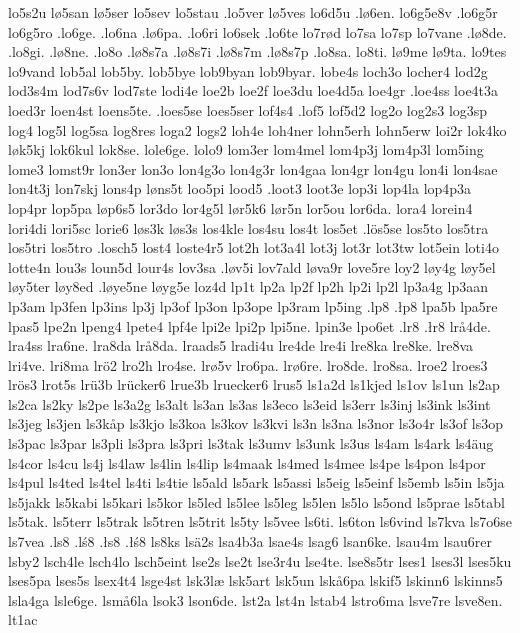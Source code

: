 {{lo5s2u
lø5san
lø5ser
lo5sev
lo5stau
.lo5ver
lø5ves
lo6d5u
.lø6en.
lo6g5e8v
.lo6g5r
lo6g5ro
.lo6ge.
.lo6na
.lø6pa.
.lo6ri
lo6sek
.lo6te
lo7rød
lo7sa
lo7sp
lo7vane
.lø8de.
.lo8gi.
.lø8ne.
.lo8o
.lø8s7a
.lø8s7i
.lø8s7m
.lø8s7p
.lo8sa.
lo8ti.
lø9me
lø9ta.
lo9tes
lo9vand
lob5al
lob5by.
lob5bye
lob9byan
lob9byar.
lobe4s
loch3o
locher4
lod2g
lod3s4m
lod7s6v
lod7ste
lodi4e
loe2b
loe2f
loe3du
loe4d5a
loe4gr
.loe4ss
loe4t3a
loed3r
loen4st
loens5te.
.loes5se
loes5ser
lof4s4
.lof5
lof5d2
log2o
log2s3
log3sp
log4
log5l
log5sa
log8res
loga2
logs2
loh4e
loh4ner
lohn5erh
lohn5erw
loi2r
lok4ko
løk5kj
lok6kul
lok8se.
lole6ge.
lolo9
lom3er
lom4mel
lom4p3j
lom4p3l
lom5ing
lome3
lomst9r
lon3er
lon3o
lon4g3o
lon4g3r
lon4gaa
lon4gr
lon4gu
lon4i
lon4sae
lon4t3j
lon7skj
lons4p
løns5t
loo5pi
lood5
.loot3
loot3e
lop3i
lop4la
lop4p3a
lop4pr
lop5pa
løp6s5
lor3do
lor4g5l
lør5k6
lør5n
lor5ou
lor6da.
lora4
lorein4
lori4di
lori5sc
lorie6
løs3k
løs3s
los4kle
los4su
los4t
los5et
.lös5se
los5to
los5tra
los5tri
los5tro
.losch5
lost4
loste4r5
lot2h
lot3a4l
lot3j
lot3r
lot3tw
lot5ein
loti4o
lotte4n
lou3s
loun5d
lour4s
lov3sa
.løv5i
lov7ald
løva9r
love5re
loy2
løy4g
løy5el
løy5ter
løy8ed
.løye5ne
løyg5e
loz4d
lp1t
lp2a
lp2f
lp2h
lp2i
lp2l
lp3a4g
lp3aan
lp3am
lp3fen
lp3ins
lp3j
lp3of
lp3on
lp3ope
lp3ram
lp5ing
.lp8
.łp8
lpa5b
lpa5re
lpas5
lpe2n
lpeng4
lpete4
lpf4e
lpi2e
lpi2p
lpi5ne.
lpin3e
lpo6et
.lr8
.łr8
lrå4de.
lra4ss
lra6ne.
lra8da
lrå8da.
lraads5
lradi4u
lre4de
lre4i
lre8ka
lre8ke.
lre8va
lri4ve.
lri8ma
lrö2
lro2h
lro4se.
lrø5v
lro6pa.
lrø6re.
lro8de.
lro8sa.
lroe2
lroes3
lrös3
lrot5s
lrü3b
lrücker6
lrue3b
lruecker6
lrus5
ls1a2d
ls1kjed
ls1ov
ls1un
ls2ap
ls2ca
ls2ky
ls2pe
ls3a2g
ls3alt
ls3an
ls3as
ls3eco
ls3eid
ls3err
ls3inj
ls3ink
ls3int
ls3jeg
ls3jen
ls3kåp
ls3kjo
ls3koa
ls3kov
ls3kvi
ls3n
ls3na
ls3nor
ls3o4r
ls3of
ls3op
ls3pac
ls3par
ls3pli
ls3pra
ls3pri
ls3tak
ls3umv
ls3unk
ls3us
ls4am
ls4ark
ls4äug
ls4cor
ls4cu
ls4j
ls4law
ls4lin
ls4lip
ls4maak
ls4med
ls4mee
ls4pe
ls4pon
ls4por
ls4pul
ls4ted
ls4tel
ls4ti
ls4tie
ls5ald
ls5ark
ls5assi
ls5eig
ls5einf
ls5emb
ls5in
ls5ja
ls5jakk
ls5kabi
ls5kari
ls5kor
ls5led
ls5lee
ls5leg
ls5len
ls5lo
ls5ond
ls5prae
ls5tabl
ls5tak.
ls5terr
ls5trak
ls5tren
ls5trit
ls5ty
ls5vee
ls6ti.
ls6ton
ls6vind
ls7kva
ls7o6se
ls7vea
.ls8
.lś8
.łs8
.łś8
ls8ks
lsä2s
lsa4b3a
lsae4s
lsag6
lsan6ke.
lsau4m
lsau6rer
lsby2
lsch4le
lsch4lo
lsch5eint
lse2s
lse2t
lse3r4u
lse4te.
lse8s5tr
lses1
lses3l
lses5ku
lses5pa
lses5s
lsex4t4
lsge4st
lsk3læ
lsk5art
lsk5un
lskå6pa
lskif5
lskinn6
lskinns5
lsla4ga
lsle6ge.
lsmå6la
lsok3
lson6de.
lst2a
lst4n
lstab4
lstro6ma
lsve7re
lsve8en.
lt1ac
}}
